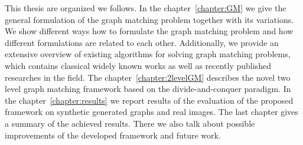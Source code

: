 This thesis are organized we follows. In the chapter~\ref{chapter:GM} we give the general formulation of the graph matching problem together with its variations. We show different ways how to formulate the graph matching problem and how different formulations are related to each other. Additionally, we provide an extensive overview of existing algorithms for solving graph matching problems, which contains classical widely known works as well as recently published researches in the field.
The chapter~\ref{chapter:2levelGM} describes the novel two level graph matching framework based on the divide-and-conquer paradigm. %
In the chapter~\ref{chapter:results} we report results of the evaluation of the proposed framework on synthetic generated graphs and real images. The last chapter gives a summary of the achieved results. There we also talk about possible improvements of the developed framework and future work.

